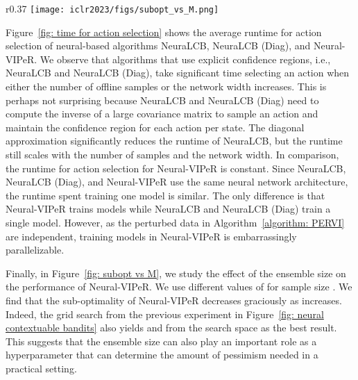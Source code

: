 \documentclass{article} \usepackage{iclr2023/iclr2023_conference,times}
\begin{document}
\begin{wrapfigure}{r}{0.37\textwidth}
\vspace{-10pt}
    \centering
    \texttt{[image: iclr2023/figs/subopt\_vs\_M.png]}
\caption{Sub-optimality of Neural-VIPeR versus different values of .}
    \label{fig: subopt vs M}
    \vspace{-5pt}
\end{wrapfigure}

Figure~\ref{fig: time for action selection} shows the average runtime for action selection of neural-based algorithms NeuraLCB, NeuraLCB (Diag), and Neural-VIPeR. We observe that algorithms that use explicit confidence regions, i.e., NeuraLCB and NeuraLCB (Diag), take significant time selecting an action when either the number of offline samples  or the network width  increases. This is perhaps not surprising because NeuraLCB and NeuraLCB (Diag) need to compute the inverse of a large covariance matrix to sample an action and maintain the confidence region for each action per state. The diagonal approximation significantly reduces the runtime of NeuraLCB, but the runtime still scales with the number of samples and the network width. In comparison, the runtime for action selection for Neural-VIPeR is constant. Since NeuraLCB, NeuraLCB (Diag), and Neural-VIPeR use the same neural network architecture, the runtime spent training one model is similar. The only difference is that Neural-VIPeR trains  models while NeuraLCB and NeuraLCB (Diag) train a single model. However, as the perturbed data in Algorithm~\ref{algorithm: PERVI} are independent, training  models in Neural-VIPeR is embarrassingly parallelizable. 

















Finally, in Figure~\ref{fig: subopt vs M}, we study the effect of the ensemble size on the performance of Neural-VIPeR. We use  different values of  for sample size . We find that the sub-optimality of Neural-VIPeR decreases graciously as  increases. Indeed, the grid search from the previous experiment in Figure~\ref{fig: neural contextuable bandits} also yields  and  from the search space  as the best result. This suggests that the ensemble size can also play an important role as a hyperparameter that can determine the amount of pessimism needed in a practical setting.
\end{document}
